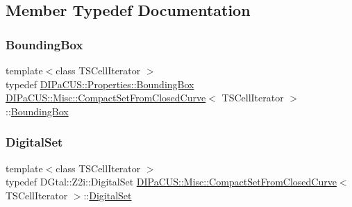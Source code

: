 \subsection{Member Typedef Documentation}
\mbox{\label{structDIPaCUS_1_1Misc_1_1CompactSetFromClosedCurve_ac4c5ff73741ac1fb3dac591a1a2ad0d9}} 
\subsubsection{\texorpdfstring{Bounding\+Box}{BoundingBox}}
{\footnotesize\ttfamily template$<$class T\+S\+Cell\+Iterator $>$ \\
typedef \hyperlink{structDIPaCUS_1_1Properties_1_1BoundingBox}{D\+I\+Pa\+C\+U\+S\+::\+Properties\+::\+Bounding\+Box} \hyperlink{structDIPaCUS_1_1Misc_1_1CompactSetFromClosedCurve}{D\+I\+Pa\+C\+U\+S\+::\+Misc\+::\+Compact\+Set\+From\+Closed\+Curve}$<$ T\+S\+Cell\+Iterator $>$\+::\hyperlink{structDIPaCUS_1_1Misc_1_1CompactSetFromClosedCurve_ac4c5ff73741ac1fb3dac591a1a2ad0d9}{Bounding\+Box}}

\mbox{\label{structDIPaCUS_1_1Misc_1_1CompactSetFromClosedCurve_a47e3100b4196961a629785d14f6ad645}} 
\subsubsection{\texorpdfstring{Digital\+Set}{DigitalSet}}
{\footnotesize\ttfamily template$<$class T\+S\+Cell\+Iterator $>$ \\
typedef D\+Gtal\+::\+Z2i\+::\+Digital\+Set \hyperlink{structDIPaCUS_1_1Misc_1_1CompactSetFromClosedCurve}{D\+I\+Pa\+C\+U\+S\+::\+Misc\+::\+Compact\+Set\+From\+Closed\+Curve}$<$ T\+S\+Cell\+Iterator $>$\+::\hyperlink{structDIPaCUS_1_1Misc_1_1CompactSetFromClosedCurve_a47e3100b4196961a629785d14f6ad645}{Digital\+Set}}

